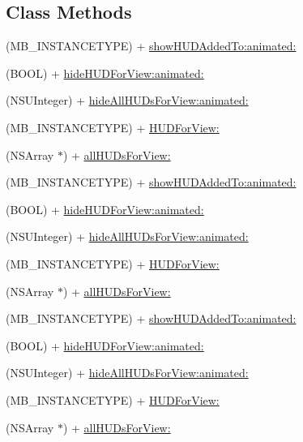 \subsection*{Class Methods}
\begin{DoxyCompactItemize}
\item 
(M\+B\+\_\+\+I\+N\+S\+T\+A\+N\+C\+E\+T\+Y\+PE) + \mbox{\hyperlink{interface_m_b_progress_h_u_d_a2a981df80fbbb85db0d6c660d5882292}{show\+H\+U\+D\+Added\+To\+:animated\+:}}
\item 
(B\+O\+OL) + \mbox{\hyperlink{interface_m_b_progress_h_u_d_a7b0826c34eea1a15d62aabd00c249666}{hide\+H\+U\+D\+For\+View\+:animated\+:}}
\item 
(N\+S\+U\+Integer) + \mbox{\hyperlink{interface_m_b_progress_h_u_d_a24782426046cf6dda1534c2d27750454}{hide\+All\+H\+U\+Ds\+For\+View\+:animated\+:}}
\item 
(M\+B\+\_\+\+I\+N\+S\+T\+A\+N\+C\+E\+T\+Y\+PE) + \mbox{\hyperlink{interface_m_b_progress_h_u_d_a30afd912f412c6612eee7f1e17241b5b}{H\+U\+D\+For\+View\+:}}
\item 
(N\+S\+Array $\ast$) + \mbox{\hyperlink{interface_m_b_progress_h_u_d_aaa8882a53b5edfd617b4ba112c60811b}{all\+H\+U\+Ds\+For\+View\+:}}
\item 
(M\+B\+\_\+\+I\+N\+S\+T\+A\+N\+C\+E\+T\+Y\+PE) + \mbox{\hyperlink{interface_m_b_progress_h_u_d_a2a981df80fbbb85db0d6c660d5882292}{show\+H\+U\+D\+Added\+To\+:animated\+:}}
\item 
(B\+O\+OL) + \mbox{\hyperlink{interface_m_b_progress_h_u_d_a7b0826c34eea1a15d62aabd00c249666}{hide\+H\+U\+D\+For\+View\+:animated\+:}}
\item 
(N\+S\+U\+Integer) + \mbox{\hyperlink{interface_m_b_progress_h_u_d_a24782426046cf6dda1534c2d27750454}{hide\+All\+H\+U\+Ds\+For\+View\+:animated\+:}}
\item 
(M\+B\+\_\+\+I\+N\+S\+T\+A\+N\+C\+E\+T\+Y\+PE) + \mbox{\hyperlink{interface_m_b_progress_h_u_d_a30afd912f412c6612eee7f1e17241b5b}{H\+U\+D\+For\+View\+:}}
\item 
(N\+S\+Array $\ast$) + \mbox{\hyperlink{interface_m_b_progress_h_u_d_aaa8882a53b5edfd617b4ba112c60811b}{all\+H\+U\+Ds\+For\+View\+:}}
\item 
(M\+B\+\_\+\+I\+N\+S\+T\+A\+N\+C\+E\+T\+Y\+PE) + \mbox{\hyperlink{interface_m_b_progress_h_u_d_a2a981df80fbbb85db0d6c660d5882292}{show\+H\+U\+D\+Added\+To\+:animated\+:}}
\item 
(B\+O\+OL) + \mbox{\hyperlink{interface_m_b_progress_h_u_d_a7b0826c34eea1a15d62aabd00c249666}{hide\+H\+U\+D\+For\+View\+:animated\+:}}
\item 
(N\+S\+U\+Integer) + \mbox{\hyperlink{interface_m_b_progress_h_u_d_a24782426046cf6dda1534c2d27750454}{hide\+All\+H\+U\+Ds\+For\+View\+:animated\+:}}
\item 
(M\+B\+\_\+\+I\+N\+S\+T\+A\+N\+C\+E\+T\+Y\+PE) + \mbox{\hyperlink{interface_m_b_progress_h_u_d_a30afd912f412c6612eee7f1e17241b5b}{H\+U\+D\+For\+View\+:}}
\item 
(N\+S\+Array $\ast$) + \mbox{\hyperlink{interface_m_b_progress_h_u_d_aaa8882a53b5edfd617b4ba112c60811b}{all\+H\+U\+Ds\+For\+View\+:}}
\end{DoxyCompactItemize}
